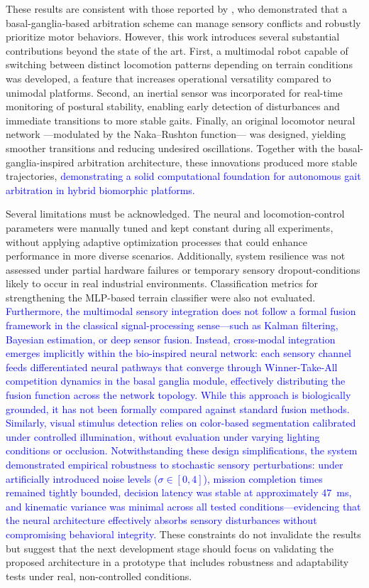 \documentclass[preprint,12pt]{elsarticle}
\newcommand{\revblue}[1]{\textcolor{blue}{#1}}
\begin{document}
These results are consistent with those reported by \citet{sarvestani2013computational}, who demonstrated that a basal-ganglia-based arbitration scheme can manage sensory conflicts and robustly prioritize motor behaviors. However, this work introduces several substantial contributions beyond the state of the art. First, a multimodal robot capable of switching between distinct locomotion patterns depending on terrain conditions was developed, a feature that increases operational versatility compared to unimodal platforms. Second, an inertial sensor was incorporated for real-time monitoring of postural stability, enabling early detection of disturbances and immediate transitions to more stable gaits. Finally, an original locomotor neural network ---modulated by the Naka–Rushton function--- was designed, yielding smoother transitions and reducing undesired oscillations. Together with the basal-ganglia-inspired arbitration architecture, these innovations produced more stable trajectories, \revblue{demonstrating a solid computational foundation for autonomous gait arbitration in hybrid biomorphic platforms.} 

Several limitations must be acknowledged. The neural and locomotion-control parameters were manually tuned and kept constant during all experiments, without applying adaptive optimization processes that could enhance performance in more diverse scenarios. Additionally, system resilience was not assessed under partial hardware failures or temporary sensory dropout-conditions likely to occur in real industrial environments. Classification metrics for strengthening the MLP-based terrain classifier were also not evaluated. \revblue{Furthermore, the multimodal sensory integration does not follow a formal fusion framework in the classical signal-processing sense---such as Kalman filtering, Bayesian estimation, or deep sensor fusion. Instead, cross-modal integration emerges implicitly within the bio-inspired neural network: each sensory channel feeds differentiated neural pathways that converge through Winner-Take-All competition dynamics in the basal ganglia module, effectively distributing the fusion function across the network topology. While this approach is biologically grounded, it has not been formally compared against standard fusion methods. Similarly, visual stimulus detection relies on color-based segmentation calibrated under controlled illumination, without evaluation under varying lighting conditions or occlusion. Notwithstanding these design simplifications, the system demonstrated empirical robustness to stochastic sensory perturbations: under artificially introduced noise levels ($\sigma \in [0, 4]$), mission completion times remained tightly bounded, decision latency was stable at approximately $47$~ms, and kinematic variance was minimal across all tested conditions---evidencing that the neural architecture effectively absorbs sensory disturbances without compromising behavioral integrity.} These constraints do not invalidate the results but suggest that the next development stage should focus on validating the proposed architecture in a prototype that includes robustness and adaptability tests under real, non-controlled conditions.
\end{document}
